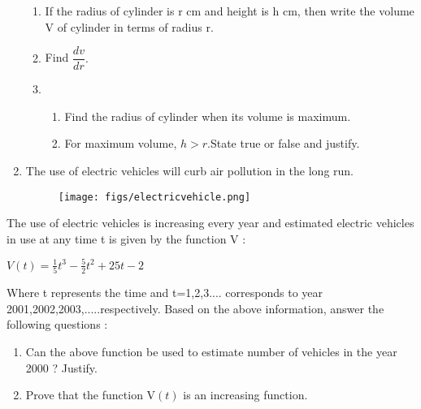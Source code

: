 \documentclass{article}
\providecommand{\brak}[1]{\ensuremath{\left(#1\right)}}
\begin{document}
\begin{enumerate}
 \begin{enumerate}[label=(\roman*)]

     \item  If the radius of cylinder is r cm and height is h cm, then write the volume V of cylinder in terms of radius r. 
     \item Find $\dfrac{dv}{dr}.$ 
     
     \item 
     \begin{enumerate}[label=\alph*)]
     \item Find the radius of cylinder when its volume is maximum. 
   
     \item  For maximum volume, $h > r$.State true or false and justify. 
 \end{enumerate}
 \end{enumerate}
    
 \item The use of electric vehicles will curb air pollution in the long run.
 
\begin{figure}[!ht]
\centering
\texttt{[image: figs/electricvehicle.png]}
\end{figure}
\end{enumerate}
  
 The use of electric vehicles is increasing every year and estimated electric vehicles in use at any time t is given by the function V :
 
 
    $V\brak{t}=\frac{1}{5}t^3 - \frac{5}{2}t^2 + 25t-2$ 



 Where t represents the time and t=1,2,3.... corresponds to year 2001,2002,2003,.....respectively.\newline
 Based on the above information, answer the following questions :
 \begin{enumerate}[label=(\roman*)]
     \item Can the above function be used to estimate number of vehicles in the year 2000 ? Justify. 
     \item Prove that the function V\brak{t} is an increasing function.
 \end{enumerate}
 
 
   
  
  
\end{document}
